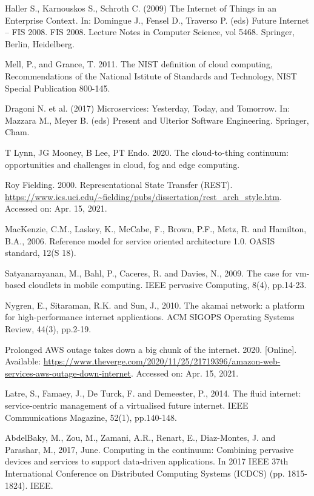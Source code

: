 \documentclass{ieeeaccess}
\begin{document}
\begin{thebibliography}{00}

 Haller S., Karnouskos S., Schroth C. (2009) The Internet of Things in an Enterprise Context. In: Domingue J., Fensel D., Traverso P. (eds) Future Internet – FIS 2008. FIS 2008. Lecture Notes in Computer Science, vol 5468. Springer, Berlin, Heidelberg.

 Mell, P., and Grance, T. 2011. The NIST definition of cloud computing, Recommendations of the National Istitute of Standards and Technology, NIST Special Publication 800-145.

 Dragoni N. et al. (2017) Microservices: Yesterday, Today, and Tomorrow. In: Mazzara M., Meyer B. (eds) Present and Ulterior Software Engineering. Springer, Cham.

 T Lynn, JG Mooney, B Lee, PT Endo. 2020. The cloud-to-thing continuum: opportunities and challenges in cloud, fog and edge computing.

 Roy Fielding. 2000. Representational State Transfer (REST). \url{https://www.ics.uci.edu/~fielding/pubs/dissertation/rest\_arch\_style.htm}. Accessed on: Apr. 15, 2021.

 MacKenzie, C.M., Laskey, K., McCabe, F., Brown, P.F., Metz, R. and Hamilton, B.A., 2006. Reference model for service oriented architecture 1.0. OASIS standard, 12(S 18).

 Satyanarayanan, M., Bahl, P., Caceres, R. and Davies, N., 2009. The case for vm-based cloudlets in mobile computing. IEEE pervasive Computing, 8(4), pp.14-23.

 Nygren, E., Sitaraman, R.K. and Sun, J., 2010. The akamai network: a platform for high-performance internet applications. ACM SIGOPS Operating Systems Review, 44(3), pp.2-19.

 Prolonged AWS outage takes down a big chunk of the internet. 2020. [Online]. Available: \url{https://www.theverge.com/2020/11/25/21719396/amazon-web-services-aws-outage-down-internet}. Accessed on: Apr. 15, 2021.

 Latre, S., Famaey, J., De Turck, F. and Demeester, P., 2014. The fluid internet: service-centric management of a virtualised future internet. IEEE Communications Magazine, 52(1), pp.140-148.

 AbdelBaky, M., Zou, M., Zamani, A.R., Renart, E., Diaz-Montes, J. and Parashar, M., 2017, June. Computing in the continuum: Combining pervasive devices and services to support data-driven applications. In 2017 IEEE 37th International Conference on Distributed Computing Systems (ICDCS) (pp. 1815-1824). IEEE.


\end{thebibliography}
\end{document}
